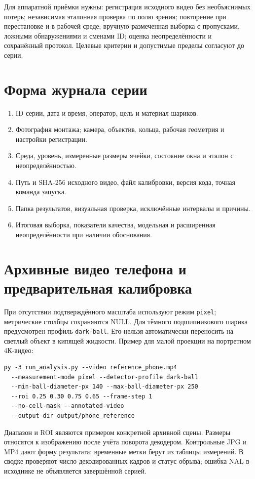 \documentclass[12pt,a4paper]{article}
\begin{document}
Для аппаратной приёмки нужны: регистрация исходного видео без необъяснимых потерь; независимая эталонная проверка по полю зрения; повторение при перестановке и в рабочей среде; вручную размеченная выборка с пропусками, ложными обнаружениями и сменами ID; оценка неопределённости и сохранённый протокол. Целевые критерии и допустимые пределы согласуют до серии.

\section{Форма журнала серии}
\begin{enumerate}
\item ID серии, дата и время, оператор, цель и материал шариков.
\item Фотография монтажа; камера, объектив, кольца, рабочая геометрия и настройки регистрации.
\item Среда, уровень, измеренные размеры ячейки, состояние окна и эталон с неопределённостью.
\item Путь и SHA-256 исходного видео, файл калибровки, версия кода, точная команда запуска.
\item Папка результатов, визуальная проверка, исключённые интервалы и причины.
\item Итоговая выборка, показатели качества, модельная и расширенная неопределённости при наличии обоснования.
\end{enumerate}
\section{Архивные видео телефона и предварительная калибровка}
При отсутствии подтверждённого масштаба используют режим \texttt{pixel}; метрические столбцы сохраняются NULL. Для тёмного подшипникового шарика предусмотрен профиль \texttt{dark-ball}. Его нельзя автоматически переносить на светлый объект в кипящей жидкости. Пример для малой проекции на портретном 4К-видео:
\begin{verbatim}
py -3 run_analysis.py --video reference_phone.mp4
  --measurement-mode pixel --detector-profile dark-ball
  --min-ball-diameter-px 140 --max-ball-diameter-px 250
  --roi 0.25 0.30 0.75 0.65 --frame-step 1
  --no-cell-mask --annotated-video
  --output-dir output/phone_reference
\end{verbatim}
Диапазон и ROI являются примером конкретной архивной сцены. Размеры относятся к изображению после учёта поворота декодером. Контрольные JPG и MP4 дают форму результата; временные метки берут из таблицы измерений. В сводке проверяют число декодированных кадров и статус обрыва; ошибка NAL в исходнике не объявляется завершённой серией.
\end{document}
